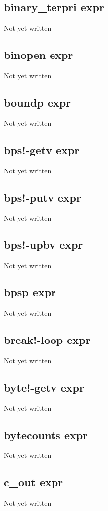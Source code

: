 \documentclass[a4paper,11pt]{article}
\begin{document}
{\subsection{\ttfamily binary\_terpri expr}
Not yet written

\subsection{\ttfamily binopen expr}
Not yet written

\subsection{\ttfamily boundp expr}
Not yet written

\subsection{\ttfamily bps!-getv expr}
Not yet written

\subsection{\ttfamily bps!-putv expr}
Not yet written

\subsection{\ttfamily bps!-upbv expr}
Not yet written

\subsection{\ttfamily bpsp expr}
Not yet written

\subsection{\ttfamily break!-loop expr}
Not yet written

\subsection{\ttfamily byte!-getv expr}
Not yet written

\subsection{\ttfamily bytecounts expr}
Not yet written

\subsection{\ttfamily c\_out expr}
Not yet written

}
\end{document}

